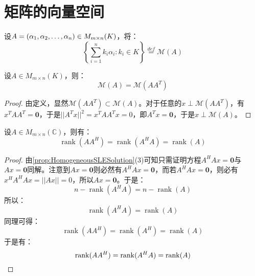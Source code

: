 \section{矩阵的向量空间}

\begin{definition}
	设$A=(\alpha_1, \alpha_2, \dots, \alpha_{n})\in M_{m\times n}(K)$，将：
	\begin{equation*}
		\left\{\sum_{i=1}^{n}k_i\alpha_i:k_i\in K\right\}\overset{def}{=}\mathcal{M}(A)
	\end{equation*}
\end{definition}

\begin{theorem}\label{theo:VectorSpaceAAAT}
	设$A\in M_{m\times n}(K)$，则：
	\begin{equation*}
		\mathcal{M}(A)=\mathcal{M}(AA^T)
	\end{equation*}
\end{theorem}
\begin{proof}
	由定义，显然$\mathcal{M}(AA^T)\subset\mathcal{M}(A)$。对于任意的$x\perp\mathcal{M}(AA^T)$，有$x^TAA^T=\mathbf{0}$，于是$||A^Tx||^2=x^TAA^Tx=0$，即$A^Tx=\mathbf{0}$，于是$x\perp\mathcal{M}(A)$。
\end{proof}

\begin{theorem}\label{theo:RankAAHA}
	设$A\in M_{m\times n}(\mathbb{C})$，则有：
	\begin{equation*}
		\operatorname{rank}(AA^H)=\operatorname{rank}(A^HA)=\operatorname{rank}(A)
	\end{equation*}
\end{theorem}
\begin{proof}
	由\cref{prop:HomogeneousSLESolution}(3)可知只需证明方程$A^HAx=\mathbf{0}$与$Ax=\mathbf{0}$同解。注意到$Ax=\mathbf{0}$则必然有$A^HAx=\mathbf{0}$，而若$A^HAx=\mathbf{0}$，则必有$x^HA^HAx=||Ax||=0$，所以$Ax=\mathbf{0}$。于是：
	\begin{equation*}
		n-\operatorname{rank}(A^HA)=n-\operatorname{rank}(A)
	\end{equation*}
	所以：
	\begin{equation*}
		\operatorname{rank}(A^HA)=\operatorname{rank}(A)
	\end{equation*}
	同理可得：
	\begin{equation*}
		\operatorname{rank}(AA^H)=\operatorname{rank}(A^H)=\operatorname{rank}(A)
	\end{equation*}
	于是有：
	\begin{equation*}
		\operatorname{rank}(AA^H)=\operatorname{rank}(A^HA)=\operatorname{rank}(A)\qedhere
	\end{equation*}
\end{proof}